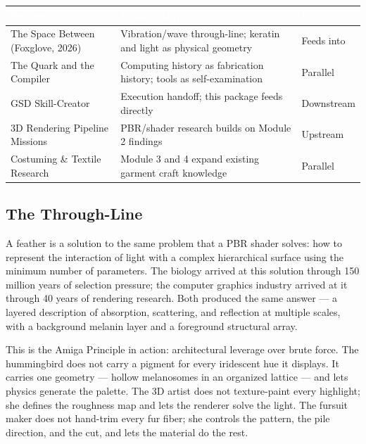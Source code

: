 \documentclass[11pt,letterpaper]{article}
\newcommand{\tableheader}[1]{\textbf{\sffamily\textcolor{white}{#1}}}
\begin{document}
\begin{center}
\begin{tabularx}{\textwidth}{L{4cm}XC{2.5cm}}
\toprule
{}
\tableheader{Document} & \tableheader{Relationship} & \tableheader{Direction} \\
\midrule
The Space Between (Foxglove, 2026) & Vibration/wave through-line; keratin and light as physical geometry & Feeds into \\
The Quark and the Compiler & Computing history as fabrication history; tools as self-examination & Parallel \\
GSD Skill-Creator & Execution handoff; this package feeds directly & Downstream \\
3D Rendering Pipeline Missions & PBR/shader research builds on Module 2 findings & Upstream \\
Costuming \& Textile Research & Module 3 and 4 expand existing garment craft knowledge & Parallel \\
\bottomrule
\end{tabularx}
\end{center}

\subsection{The Through-Line}

A feather is a solution to the same problem that a PBR shader solves: how to represent the interaction of light with a complex hierarchical surface using the minimum number of parameters. The biology arrived at this solution through 150 million years of selection pressure; the computer graphics industry arrived at it through 40 years of rendering research. Both produced the same answer --- a layered description of absorption, scattering, and reflection at multiple scales, with a background melanin layer and a foreground structural array.

This is the Amiga Principle in action: architectural leverage over brute force. The hummingbird does not carry a pigment for every iridescent hue it displays. It carries one geometry --- hollow melanosomes in an organized lattice --- and lets physics generate the palette. The 3D artist does not texture-paint every highlight; she defines the roughness map and lets the renderer solve the light. The fursuit maker does not hand-trim every fur fiber; she controls the pattern, the pile direction, and the cut, and lets the material do the rest.
\end{document}
